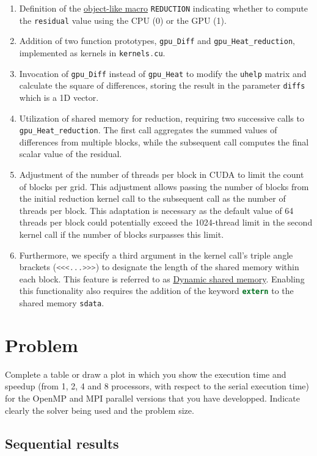 \documentclass[titlepage]{article}
\newcommand{\incode}[1]{\lstinline[style=inlineC,language=C]{#1}}
\newcounter{qcounter}
\newcounter{subqcounter}[qcounter]
\newcommand{\q}[1]{%
    \stepcounter{qcounter} %
    \setcounter{subqcounter}{0} %
    \section{Problem \arabic{qcounter}}
        #1
    \medskip
}
\begin{document}
\begin{enumerate}
    \item Definition of the \href{https://gcc.gnu.org/onlinedocs/cpp/Object-like-Macros.html}{object-like macro} \incode{REDUCTION} indicating whether to compute the \incode{residual} value using the CPU (0) or the GPU (1).
    \item Addition of two function prototypes, \incode{gpu_Diff} and \incode{gpu_Heat_reduction}, implemented as kernels in \incode{kernels.cu}.
    \item Invocation of \incode{gpu_Diff} instead of \incode{gpu_Heat} to modify the \incode{uhelp} matrix and calculate the square of differences, storing the result in the parameter \incode{diffs} which is a 1D vector.
    \item Utilization of shared memory for reduction, requiring two successive calls to \incode{gpu_Heat_reduction}. The first call aggregates the summed values of differences from multiple blocks, while the subsequent call computes the final scalar value of the residual.
    \item Adjustment of the number of threads per block in CUDA to limit the count of blocks per grid. This adjustment allows passing the number of blocks from the initial reduction kernel call to the subsequent call as the number of threads per block. This adaptation is necessary as the default value of 64 threads per block could potentially exceed the 1024-thread limit in the second kernel call if the number of blocks surpasses this limit.
    \item Furthermore, we specify a third argument in the kernel call's triple angle brackets (\incode{<<<...>>>}) to designate the length of the shared memory within each block. This feature is referred to as \href{https://developer.nvidia.com/blog/using-shared-memory-cuda-cc/}{Dynamic shared memory}. Enabling this functionality also requires the addition of the keyword \incode{extern} to the shared memory \incode{sdata}.
\end{enumerate}

\q{Complete a table or draw a plot in which you show the execution time and speedup (from 1, 2, 4 and 8 processors, with respect to the serial execution time) for the OpenMP and MPI parallel versions that you have developped. Indicate clearly the solver being used and the problem size.}

\subsection{Sequential results}
\end{document}
